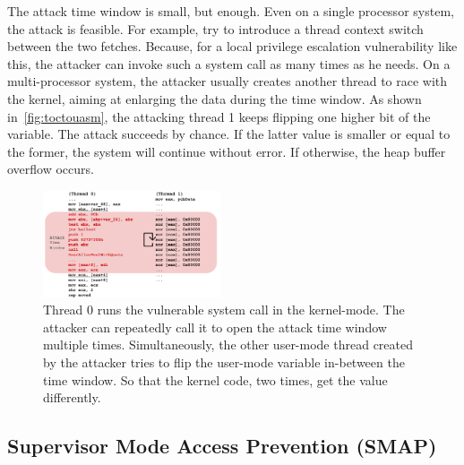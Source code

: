 The attack time window is small, but enough. Even on a single processor system, the attack is feasible. For example, try to introduce a thread context switch between the two fetches. Because, for a local privilege escalation vulnerability like this, the attacker can invoke such a system call as many times as he needs. On a multi-processor system, the attacker usually creates another thread to race with the kernel, aiming at enlarging the data during the time window. As shown in~\autoref{fig:toctouasm}, the attacking thread 1 keeps flipping one higher bit of the variable. The attack succeeds by chance. If the latter value is smaller or equal to the former, the system will continue without error. If otherwise, the heap buffer overflow occurs.




\begin{figure}[ht]
  \includegraphics[width=0.47\textwidth]{figures/toctouasm3}
  \centering
  \caption{Thread 0 runs the vulnerable system call in the kernel-mode. The attacker can repeatedly call it to open the attack time window multiple times. Simultaneously, the other user-mode thread created by the attacker tries to flip the user-mode variable in-between the time window. So that the kernel code, two times, get the value differently.}
  \label{fig:toctouasm}
\end{figure}



\subsection{Supervisor Mode Access Prevention (SMAP)}


